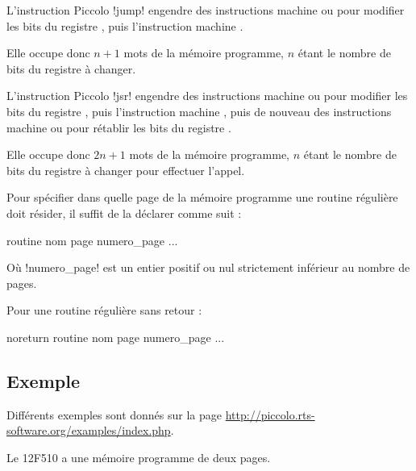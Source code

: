 
L'instruction Piccolo  \pic!jump! engendre des instructions machine  ou  pour modifier les bits  du registre , puis l'instruction machine .

Elle occupe donc $n+1$ mots de la mémoire programme, $n$ étant le nombre de bits  du registre  à changer.





L'instruction Piccolo  \pic!jsr! engendre des instructions machine  ou  pour modifier les bits  du registre , puis l'instruction machine , puis de nouveau des instructions machine  ou  pour rétablir les bits  du registre .

Elle occupe donc $2n+1$ mots de la mémoire programme, $n$ étant le nombre de bits  du registre  à changer pour effectuer l'appel.


Pour spécifier dans quelle page de la mémoire programme une routine régulière doit résider, il suffit de la déclarer comme suit :
\begin{piccolo}
  routine nom page numero_page {
    ...
  }
\end{piccolo}

Où \pic!numero_page! est un entier positif ou nul strictement inférieur au nombre de pages.

Pour une routine régulière sans retour :
\begin{piccolo}
  noreturn routine nom page numero_page {
    ...
  }
\end{piccolo}

\subsection{Exemple}

Différents exemples sont donnés sur la page \url{http://piccolo.rts-software.org/examples/index.php}.

Le 12F510 a une mémoire programme de deux pages. 

